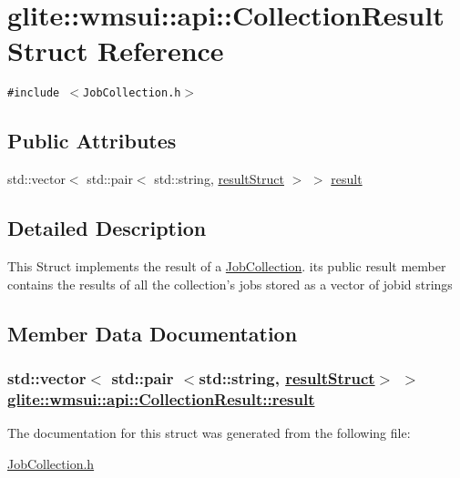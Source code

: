 \hypertarget{structglite_1_1wmsui_1_1api_1_1CollectionResult}{
\section{glite::wmsui::api::Collection\-Result Struct Reference}
\label{structglite_1_1wmsui_1_1api_1_1CollectionResult}
}
{\tt \#include $<$Job\-Collection.h$>$}

\subsection*{Public Attributes}
\begin{CompactItemize}
\item 
std::vector$<$ std::pair$<$ std::string, \hyperlink{classglite_1_1wmsui_1_1api_1_1resultStruct}{result\-Struct} $>$ $>$ \hyperlink{structglite_1_1wmsui_1_1api_1_1CollectionResult_o0}{result}
\end{CompactItemize}


\subsection{Detailed Description}
This Struct implements the result of a \hyperlink{classglite_1_1wmsui_1_1api_1_1JobCollection}{Job\-Collection}. its public result member contains the results of all the collection's jobs stored as a vector of jobid strings 



\subsection{Member Data Documentation}
\hypertarget{structglite_1_1wmsui_1_1api_1_1CollectionResult_o0}{
\subsubsection[result]{\setlength{\rightskip}{0pt plus 5cm}std::vector$<$ std::pair $<$std::string, \hyperlink{classglite_1_1wmsui_1_1api_1_1resultStruct}{result\-Struct}$>$ $>$ \hyperlink{structglite_1_1wmsui_1_1api_1_1CollectionResult_o0}{glite::wmsui::api::Collection\-Result::result}}}
\label{structglite_1_1wmsui_1_1api_1_1CollectionResult_o0}




The documentation for this struct was generated from the following file:\begin{CompactItemize}
\item 
\hyperlink{JobCollection_8h}{Job\-Collection.h}\end{CompactItemize}
